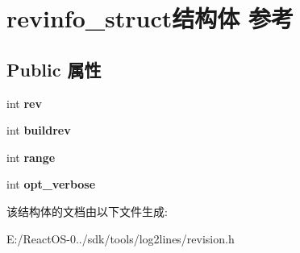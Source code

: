 \hypertarget{structrevinfo__struct}{}\section{revinfo\+\_\+struct结构体 参考}
\label{structrevinfo__struct}
\subsection*{Public 属性}
\begin{DoxyCompactItemize}
\item 
\mbox{\label{structrevinfo__struct_a3e73202e67f581a3143a4b31dec60933}} 
int {\bfseries rev}
\item 
\mbox{\label{structrevinfo__struct_a539a84e7458c618265e9b6bf7caceb55}} 
int {\bfseries buildrev}
\item 
\mbox{\label{structrevinfo__struct_ab26b764ddcc15b92f25c73137d6e4680}} 
int {\bfseries range}
\item 
\mbox{\label{structrevinfo__struct_a1e89b00a7e8e459985ccb47cfec88b38}} 
int {\bfseries opt\+\_\+verbose}
\end{DoxyCompactItemize}


该结构体的文档由以下文件生成\+:\begin{DoxyCompactItemize}
\item 
E\+:/\+React\+O\+S-\/0../sdk/tools/log2lines/revision.\+h\end{DoxyCompactItemize}
